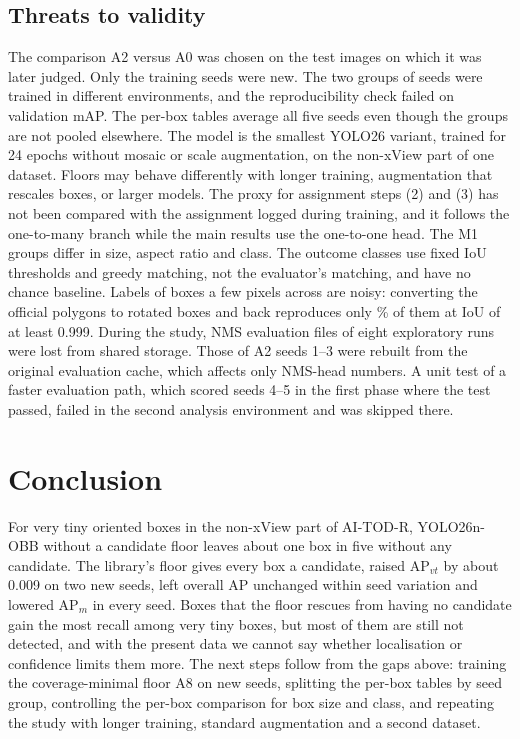 \documentclass[11pt]{article}
\begin{document}
\subsection{Threats to validity}\label{sec:threats}
The comparison A2 versus A0 was chosen on the test images on which it was later judged. Only the training seeds were new. The
two groups of seeds were trained in different environments, and the reproducibility check failed on validation mAP. The
per-box tables average all five seeds even though the groups are not pooled elsewhere. The model is the smallest YOLO26 variant,
trained for 24 epochs without mosaic or scale augmentation, on the non-xView part of one dataset. Floors may behave differently
with longer training, augmentation that rescales boxes, or larger models. The proxy for assignment steps (2) and (3) has not been
compared with the assignment logged during training, and it follows the one-to-many branch while the main results use the
one-to-one head. The M1 groups differ in size, aspect ratio and class. The outcome classes use fixed IoU thresholds and greedy
matching, not the evaluator's matching, and have no chance baseline. Labels of boxes a few pixels across are noisy: converting
the official polygons to rotated boxes and back reproduces only \rtFrac\% of them at IoU of at least 0.999. During the study,
NMS evaluation files of eight exploratory runs were lost from shared storage. Those of A2 seeds 1--3 were rebuilt from the
original evaluation cache, which affects only NMS-head numbers. A unit test of a faster evaluation path, which scored seeds 4--5 in
the first phase where the test passed, failed in the second analysis environment and was skipped there.

\section{Conclusion}
For very tiny oriented boxes in the non-xView part of AI-TOD-R, YOLO26n-OBB without a candidate floor leaves about one box in
five without any candidate. The library's floor gives every box a candidate, raised AP$_{vt}$ by about 0.009 on two new seeds, left
overall AP unchanged within seed variation and lowered AP$_m$ in every seed. Boxes that the floor rescues from having no candidate
gain the most recall among very tiny boxes, but most of them are still not detected, and with the present data we cannot say
whether localisation or confidence limits them more. The next steps follow from the gaps above: training the coverage-minimal
floor A8 on new seeds, splitting the per-box tables by seed group, controlling the per-box comparison for box size and class, and
repeating the study with longer training, standard augmentation and a second dataset.
\end{document}
